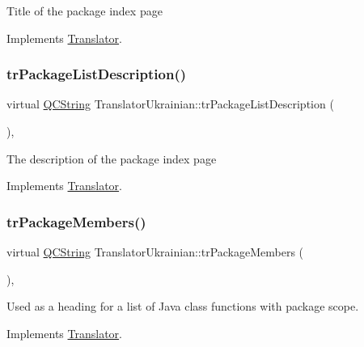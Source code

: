 Title of the package index page 

Implements \mbox{\hyperlink{class_translator}{Translator}}.

\mbox{\label{class_translator_ukrainian_a760ae22c75a6e234ecb2308932c50d9f}} 
\subsubsection{\texorpdfstring{trPackageListDescription()}{trPackageListDescription()}}
{\footnotesize\ttfamily virtual \mbox{\hyperlink{class_q_c_string}{Q\+C\+String}} Translator\+Ukrainian\+::tr\+Package\+List\+Description (\begin{DoxyParamCaption}{ }\end{DoxyParamCaption})\hspace{0.3cm}{\ttfamily [inline]}, {\ttfamily [virtual]}}

The description of the package index page 

Implements \mbox{\hyperlink{class_translator}{Translator}}.

\mbox{\label{class_translator_ukrainian_ae56f626e326e4b43eb322687da1715a9}} 
\subsubsection{\texorpdfstring{trPackageMembers()}{trPackageMembers()}}
{\footnotesize\ttfamily virtual \mbox{\hyperlink{class_q_c_string}{Q\+C\+String}} Translator\+Ukrainian\+::tr\+Package\+Members (\begin{DoxyParamCaption}{ }\end{DoxyParamCaption})\hspace{0.3cm}{\ttfamily [inline]}, {\ttfamily [virtual]}}

Used as a heading for a list of Java class functions with package scope. 

Implements \mbox{\hyperlink{class_translator}{Translator}}.

\mbox{\label{class_translator_ukrainian_a6b18d33ec8475983918b45d2ce8bfac7}} 
